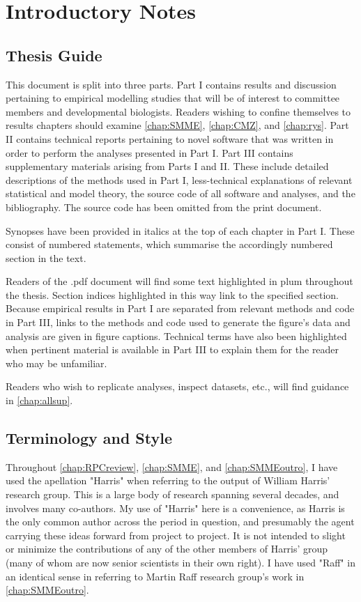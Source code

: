 \section*{Introductory Notes}
\label{ch:intro}

\subsection*{Thesis Guide}
This document is split into three parts. Part I contains results and discussion pertaining to empirical modelling studies that will be of interest to committee members and developmental biologists. Readers wishing to confine themselves to results chapters should examine \autoref{chap:SMME}, \autoref{chap:CMZ}, and \autoref{chap:rys}. Part II contains technical reports pertaining to novel software that was written in order to perform the analyses presented in Part I. Part III contains supplementary materials arising from Parts I and II. These include detailed descriptions of the methods used in Part I, less-technical explanations of relevant statistical and model theory, the source code of all software and analyses, and the bibliography. The source code has been omitted from the print document.

Synopses have been provided in italics at the top of each chapter in Part I. These consist of numbered statements, which summarise the accordingly numbered section in the text.

Readers of the .pdf document will find some text highlighted in plum throughout the thesis. Section indices highlighted in this way link to the specified section.  Because empirical results in Part I are separated from relevant methods and code in Part III, links to the methods and code used to generate the figure's data and analysis are given in figure captions. Technical terms have also been highlighted when pertinent material is available in Part III to explain them for the reader who may be unfamiliar.

Readers who wish to replicate analyses, inspect datasets, etc., will find guidance in \autoref{chap:allsup}.

\subsection*{Terminology and Style}
Throughout \autoref{chap:RPCreview}, \autoref{chap:SMME}, and \autoref{chap:SMMEoutro}, I have used the apellation "Harris" when referring to the output of William Harris' research group. This is a large body of research spanning several decades, and involves many co-authors. My use of "Harris" here is a convenience, as Harris is the only common author across the period in question, and presumably the agent carrying these ideas forward from project to project. It is not intended to slight or minimize the contributions of any of the other members of Harris' group (many of whom are now senior scientists in their own right). I have used "Raff" in an identical sense in referring to Martin Raff research group's work in \autoref{chap:SMMEoutro}.

